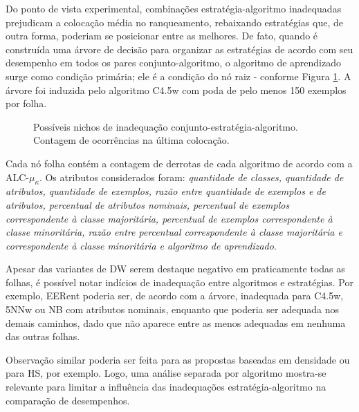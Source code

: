 Do ponto de vista experimental, combinações estratégia-algoritmo inadequadas prejudicam a colocação média no ranqueamento, rebaixando estratégias que, de outra forma, poderiam se posicionar entre as melhores.
De fato, quando é construída uma árvore de decisão para organizar as estratégias de acordo com seu desempenho em todos os pares conjunto-algoritmo, o algoritmo de aprendizado surge como condição primária; ele é a condição do nó raiz - conforme Figura \ref{treebadst}.
A árvore foi induzida pelo algoritmo C4.5w com poda de pelo menos 150 exemplos por folha.
\begin{figure}
	\centering
	
	\caption[Possíveis nichos de inadequação conjunto-estratégia-algoritmo.]{Possíveis nichos de inadequação conjunto-estratégia-algoritmo. Contagem de ocorrências na última colocação.}
	\label{treebadst}
\end{figure}

Cada nó folha contém a contagem de derrotas de cada algoritmo de acordo com a ALC-$\mu_\kappa$.
Os atributos considerados foram: \textit{quantidade de classes, quantidade de atributos, quantidade de exemplos, razão entre quantidade de exemplos e de atributos, percentual de atributos nominais, percentual de exemplos correspondente à classe majoritária, percentual de exemplos correspondente à classe minoritária, razão entre percentual correspondente à classe majoritária e correspondente à classe minoritária e algoritmo de aprendizado}.

Apesar das variantes de DW serem destaque negativo em praticamente todas as folhas, é possível notar indícios de inadequação entre algoritmos e estratégias.
Por exemplo, EERent poderia ser, de acordo com a árvore, inadequada para C4.5w, 5NNw ou NB com atributos nominais, enquanto que poderia ser adequada nos demais caminhos, dado que não aparece entre as menos adequadas em nenhuma das outras folhas.

Observação similar poderia ser feita para as propostas baseadas em densidade ou para HS, por exemplo.
Logo, uma análise separada por algoritmo mostra-se relevante para limitar a influência das inadequações estratégia-algoritmo na comparação de desempenhos.

